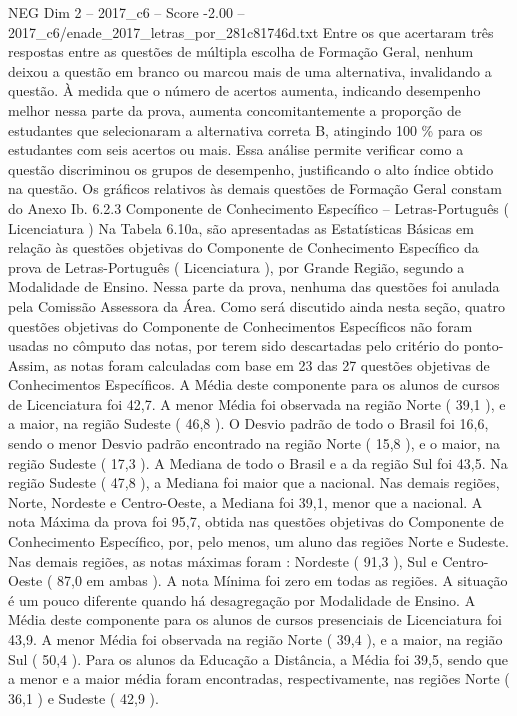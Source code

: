 \begin{textsample}{NEG Dim 2 – 2017\_c6 – Score -2.00 – 2017\_c6/enade\_2017\_letras\_por\_281c81746d.txt}
Entre os que acertaram três respostas entre as questões de múltipla escolha de Formação Geral, nenhum deixou a questão em branco ou marcou mais de uma alternativa, invalidando a questão.
À medida que o número de acertos aumenta, indicando desempenho melhor nessa parte da prova, aumenta concomitantemente a proporção de estudantes que selecionaram a alternativa correta B, atingindo 100 \% para os estudantes com seis acertos ou mais.
Essa análise permite verificar como a questão discriminou os grupos de desempenho, justificando o alto índice obtido na questão.
Os gráficos relativos às demais questões de Formação Geral constam do Anexo Ib. 6.2.3 Componente de Conhecimento Específico – Letras-Português ( Licenciatura ) Na Tabela 6.10a, são apresentadas as Estatísticas Básicas em relação às questões objetivas do Componente de Conhecimento Específico da prova de Letras-Português ( Licenciatura ), por Grande Região, segundo a Modalidade de Ensino.
Nessa parte da prova, nenhuma das questões foi anulada pela Comissão Assessora da Área.
Como será discutido ainda nesta seção, quatro questões objetivas do Componente de Conhecimentos Específicos não foram usadas no cômputo das notas, por terem sido descartadas pelo critério do ponto- Assim, as notas foram calculadas com base em 23 das 27 questões objetivas de Conhecimentos Específicos.
A Média deste componente para os alunos de cursos de Licenciatura foi 42,7.
A menor Média foi observada na região Norte ( 39,1 ), e a maior, na região Sudeste ( 46,8 ).
O Desvio padrão de todo o Brasil foi 16,6, sendo o menor Desvio padrão encontrado na região Norte ( 15,8 ), e o maior, na região Sudeste ( 17,3 ).
A Mediana de todo o Brasil e a da região Sul foi 43,5.
Na região Sudeste ( 47,8 ), a Mediana foi maior que a nacional.
Nas demais regiões, Norte, Nordeste e Centro-Oeste, a Mediana foi 39,1, menor que a nacional.
A nota Máxima da prova foi 95,7, obtida nas questões objetivas do Componente de Conhecimento Específico, por, pelo menos, um aluno das regiões Norte e Sudeste.
Nas demais regiões, as notas máximas foram : Nordeste ( 91,3 ), Sul e Centro-Oeste ( 87,0 em ambas ).
A nota Mínima foi zero em todas as regiões.
A situação é um pouco diferente quando há desagregação por Modalidade de Ensino.
A Média deste componente para os alunos de cursos presenciais de Licenciatura foi 43,9.
A menor Média foi observada na região Norte ( 39,4 ), e a maior, na região Sul ( 50,4 ).
Para os alunos da Educação a Distância, a Média foi 39,5, sendo que a menor e a maior média foram encontradas, respectivamente, nas regiões Norte ( 36,1 ) e Sudeste ( 42,9 ).

\end{textsample}
